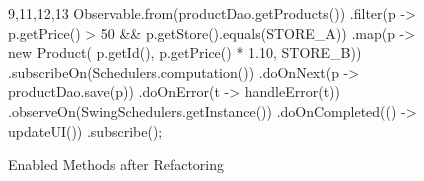 \begin{figure}[h]
\begin{sourcecode}
\begin{javacode}{9,11,12,13}
Observable.from(productDao.getProducts())
        .filter(p ->
                p.getPrice() > 50 &&
                p.getStore().equals(STORE_A))
        .map(p -> new Product(
                p.getId(),
                p.getPrice() * 1.10,
                STORE_B))
        .subscribeOn(Schedulers.computation())
        .doOnNext(p -> productDao.save(p))
        .doOnError(t -> handleError(t))
        .observeOn(SwingSchedulers.getInstance())
        .doOnCompleted(() -> updateUI())
        .subscribe();
\end{javacode}
\caption{Enabled Methods after Refactoring}
\label{code:con-enabled-methods-java8}
\end{sourcecode}
\end{figure}